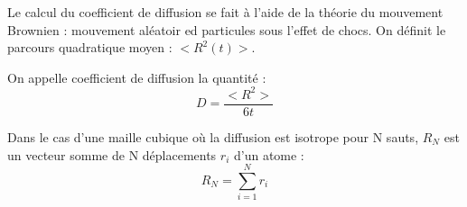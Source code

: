 Le calcul du coefficient de diffusion se fait à l'aide de la théorie du mouvement Brownien : mouvement aléatoir ed particules sous l'effet de chocs. On définit le parcours quadratique moyen : $<R^2(t)>$.

On appelle coefficient de diffusion la quantité :
\begin{equation}
D = \frac{<R^2>}{6t}
\end{equation}

Dans le cas d'une maille cubique où la diffusion est isotrope pour N sauts, $R_N$ est un vecteur somme de N déplacements $r_i$ d'un atome :
\begin{equation}
R_N = \sum_{i=1}^N r_i
\end{equation}

